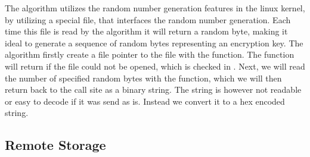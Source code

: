 

The algorithm utilizes the random number generation features in the linux kernel, by utilizing a special file,  that interfaces the random number generation. Each time this file is read by the algorithm it will return a random byte, making it ideal to generate a sequence of random bytes representing an encryption key. The algorithm firstly create a file pointer to the  file with the  function. The function will return  if the file could not be opened, which is checked in . Next, we will read the number of specified random bytes with the  function, which we will then return back to the call site as a binary string. The string is however not readable or easy to decode if it was send as is. Instead we convert it to a hex encoded string. 


\subsection{Remote Storage}
\label{sub:remote_storage}


